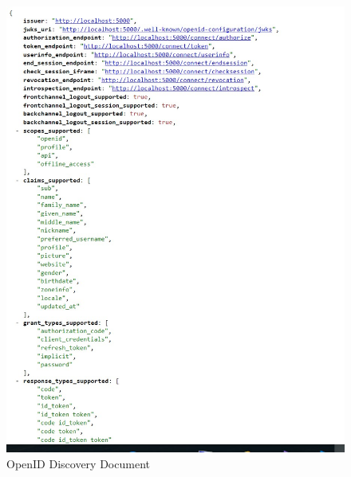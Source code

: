 \begin{figure}[h]
	\centering
	\includegraphics[width=0.8\linewidth]{images/openid-discovery-document}
	\caption{OpenID Discovery Document}
	\label{fig:openid-discovery-document}
\end{figure}

\chapterend
